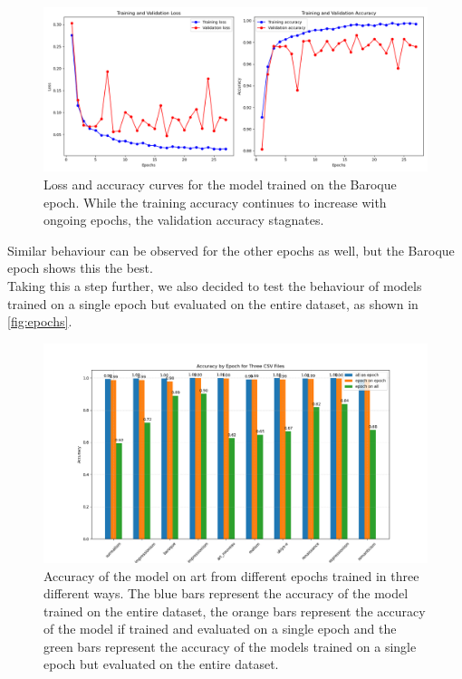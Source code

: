 \begin{figure}[h!]
    \centering
    \includegraphics[width=1\textwidth]{images/example_overfitting_baroque.png}
    \caption{Loss and accuracy curves for the model trained on the Baroque epoch. While the training accuracy continues to increase with ongoing epochs, the validation accuracy stagnates.}
    \label{fig:overfitting}
\end{figure}

Similar behaviour can be observed for the other epochs as well, but the Baroque epoch shows this the best. \\

Taking this a step further, we also decided to test the behaviour of models trained on a single epoch but evaluated on the entire dataset, as shown in \autoref{fig:epochs}.

\begin{figure}[h!]
    \centering
    \includegraphics[width=1\textwidth]{images/accuracy_by_epoch.png}
    \caption{Accuracy of the model on art from different epochs trained in three different ways. The blue bars represent the accuracy of the model trained on the entire dataset,
     the orange bars represent the accuracy of the model if trained and evaluated on a single epoch 
     and the green bars represent the accuracy of the models trained on a single epoch but evaluated on the entire dataset.}
    \label{fig:epochs}
\end{figure}

